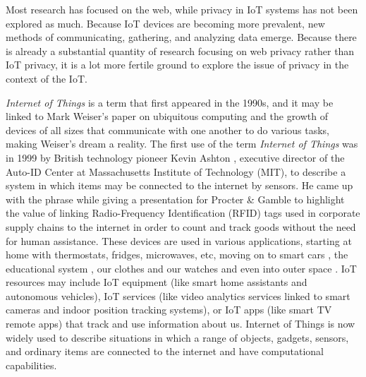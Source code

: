\documentclass[conference]{IEEEtran}
\begin{document}
Most research has focused on the web, while privacy in IoT systems has not
been explored as much. Because IoT devices are becoming more prevalent,
new methods of communicating, gathering, and analyzing data emerge.
Because there is already a substantial quantity of research focusing on web
privacy rather than IoT privacy, it is a lot more fertile ground to explore
the issue of privacy in the context of the IoT.

\textit{Internet of Things} is a term that first appeared in the 1990s,
and it may be linked to Mark Weiser's paper on ubiquitous computing \cite{weiser1991computer}
and the growth of devices of all sizes that communicate with one another
to do various tasks, making Weiser's dream a reality. The first use of the
term \textit{Internet of Things} was in 1999 by British technology pioneer
Kevin Ashton \cite{KevinThat}, executive director of the Auto-ID Center at
Massachusetts Institute of Technology (MIT), to describe a system in which
items may be connected to the internet by sensors. He came up with the phrase
while giving a presentation for Procter \& Gamble to highlight the value
of linking Radio-Frequency Identification (RFID) tags used in corporate
supply chains to the internet in order to count and track goods without the
need for human assistance. These devices are used in various applications,
starting at home \cite{marikyan2019systematic} with thermostats, fridges,
microwaves, etc, moving on to smart cars \cite{arena2020overview}, the
educational system \cite{al2020survey}, our clothes and our watches \cite{niknejad2020comprehensive}
and even into outer space \cite{AkyildizInternet}. IoT resources may include
IoT equipment (like smart home assistants and autonomous vehicles), IoT
services (like video analytics services linked to smart cameras and indoor
position tracking systems), or IoT apps (like smart TV remote apps) that
track and use information about us. Internet of Things is now widely used
to describe situations in which a range of objects, gadgets, sensors, and
ordinary items are connected to the internet and have computational capabilities.
\end{document}
